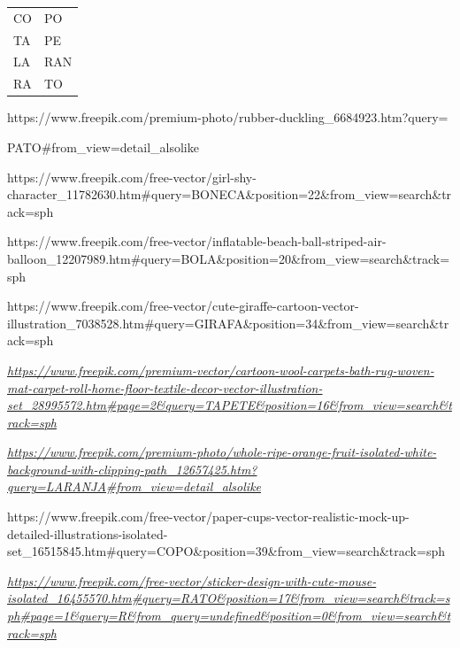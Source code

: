 \begin{longtable}[]{@{}ll@{}}
\toprule
CO & PO\tabularnewline
TA & PE\tabularnewline
LA & RAN\tabularnewline
RA & TO\tabularnewline
\bottomrule
\end{longtable}

https://www.freepik.com/premium-photo/rubber-duckling\_6684923.htm?query=

PATO\#from\_view=detail\_alsolike

https://www.freepik.com/free-vector/girl-shy-character\_11782630.htm\#query=BONECA\&position=22\&from\_view=search\&track=sph

https://www.freepik.com/free-vector/inflatable-beach-ball-striped-air-balloon\_12207989.htm\#query=BOLA\&position=20\&from\_view=search\&track=sph

https://www.freepik.com/free-vector/cute-giraffe-cartoon-vector-illustration\_7038528.htm\#query=GIRAFA\&position=34\&from\_view=search\&track=sph

\href{https://www.freepik.com/premium-vector/cartoon-wool-carpets-bath-rug-woven-mat-carpet-roll-home-floor-textile-decor-vector-illustration-set_28995572.htm\#page=2\&query=TAPETE\&position=16\&from_view=search\&track=sph}{\emph{https://www.freepik.com/premium-vector/cartoon-wool-carpets-bath-rug-woven-mat-carpet-roll-home-floor-textile-decor-vector-illustration-set\_28995572.htm\#page=2\&query=TAPETE\&position=16\&from\_view=search\&track=sph}}

\href{https://www.freepik.com/premium-photo/whole-ripe-orange-fruit-isolated-white-background-with-clipping-path_12657425.htm?query=LARANJA\#from_view=detail_alsolike}{\emph{https://www.freepik.com/premium-photo/whole-ripe-orange-fruit-isolated-white-background-with-clipping-path\_12657425.htm?query=LARANJA\#from\_view=detail\_alsolike}}

https://www.freepik.com/free-vector/paper-cups-vector-realistic-mock-up-detailed-illustrations-isolated-set\_16515845.htm\#query=COPO\&position=39\&from\_view=search\&track=sph

\href{https://www.freepik.com/free-vector/sticker-design-with-cute-mouse-isolated_16455570.htm\#query=RATO\&position=17\&from_view=search\&track=sph\#page=1\&query=R\&from_query=undefined\&position=0\&from_view=search\&track=sph}{\emph{https://www.freepik.com/free-vector/sticker-design-with-cute-mouse-isolated\_16455570.htm\#query=RATO\&position=17\&from\_view=search\&track=sph\#page=1\&query=R\&from\_query=undefined\&position=0\&from\_view=search\&track=sph}}

